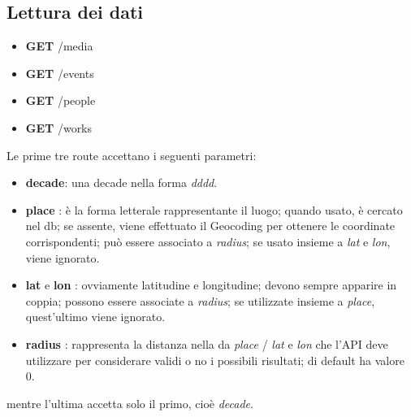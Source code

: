 \documentclass[sigproc-sp.tex]{subfiles}
\begin{document}
\subsection{Lettura dei dati}
\begin{itemize}
\item \textbf{GET} /media
\item \textbf{GET} /events
\item \textbf{GET} /people
\item \textbf{GET} /works
\end{itemize}
Le prime tre route accettano i seguenti parametri:
\begin{itemize}
\item \textbf{decade}: una decade nella forma \textit{dddd}.
\item \textbf{place} : è la forma letterale rappresentante il luogo; quando usato, è cercato nel db; se assente, viene effettuato il Geocoding per ottenere le coordinate corrispondenti; può essere associato a \textit{radius}; se usato insieme a \textit{lat} e \textit{lon}, viene ignorato.
\item \textbf{lat} e \textbf{lon} : ovviamente latitudine e longitudine; devono sempre apparire in coppia; possono essere associate a \textit{radius}; se utilizzate insieme a \textit{place}, quest'ultimo viene ignorato.
\item \textbf{radius} : rappresenta la distanza nella da \textit{place} / \textit{lat} e \textit{lon} che l'API deve utilizzare per considerare validi o no i possibili risultati; di default ha valore 0.
\end{itemize}
mentre l'ultima accetta solo il primo, cioè \textit{decade}.
\end{document}
